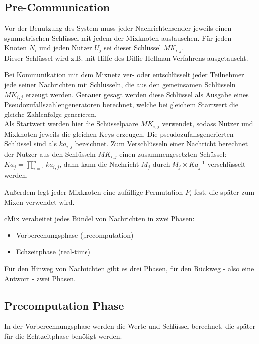 \documentclass[
    fontsize=12pt,
    headings=small,
    parskip=half,           %
    bibliography=totoc,
    numbers=noenddot,       %
    open=any,               %
    final                   %
    ]{scrreprt}
\begin{document}
\subsection{Pre-Communication}

Vor der Benutzung des System muss jeder Nachrichtensender jeweils einen symmetrischen Schlüssel mit jedem der Mixknoten austauschen.
Für jeden Knoten $N_i$ und jeden Nutzer $U_j$ sei dieser Schlüssel $MK_{i,j}$.\\
Dieser Schlüssel wird z.B. mit Hilfe des Diffie-Hellman Verfahrens ausgetauscht.

Bei Kommunikation mit dem Mixnetz ver- oder entschlüsselt jeder Teilnehmer jede seiner Nachrichten mit Schlüsseln, die aus den gemeinsamen Schlüsseln \(MK_{i,j}\) erzeugt werden.
Genauer gesagt werden diese Schlüssel als Ausgabe eines Pseudozufallszahlengeneratoren berechnet, welche bei gleichem Startwert die gleiche Zahlenfolge generieren.\\
Als Startwert werden hier die Schüsselpaare \(MK_{i,j}\) verwendet, sodass Nutzer und Mixknoten jeweils die gleichen Keys erzeugen.
Die pseudozufallsgenerierten Schlüssel sind als \(ka_{i,j}\) bezeichnet.
Zum Verschlüsseln einer Nachricht berechnet der Nutzer aus den Schlüsseln \(MK_{i,j}\)
einen zusammengesetzten Schüssel: \(Ka_j = \prod_{i=1}^{n} ka_{i,j}\),
dann kann die Nachricht \(M_j\) durch \(M_j \times Ka_{j}^{-1}\) verschlüsselt werden.

Außerdem legt jeder Mixknoten eine zufällige Permutation $P_i$ fest, die später zum Mixen verwendet wird.

cMix verabeitet jedes Bündel von Nachrichten in zwei Phasen:
\begin{itemize}
	\item Vorberechungsphase (precomputation)
	\item Echzeitphase (real-time)
\end{itemize}

Für den Hinweg von Nachrichten gibt es drei Phasen,
für den Rückweg - also eine Antwort - zwei Phasen.


\subsection{Precomputation Phase}

In der Vorberechnungsphase werden die Werte und Schlüssel berechnet, die später für die Echtzeitphase benötigt werden.
\end{document}
